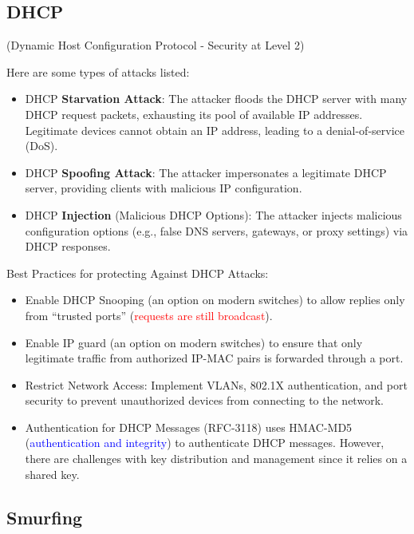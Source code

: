 \begin{center}
    \section{DHCP}
    (Dynamic Host Configuration Protocol - Security at Level 2)
\end{center}
Here are some types of attacks listed:
\begin{itemize}
    \item DHCP \textbf{Starvation Attack}: The attacker floods the DHCP server with many DHCP request packets, exhausting its pool of available IP addresses. Legitimate devices cannot obtain an IP address, leading to a denial-of-service (DoS).
    \item DHCP \textbf{Spoofing Attack}: The attacker impersonates a legitimate DHCP server, providing clients with malicious IP configuration.
    \item DHCP \textbf{Injection} (Malicious DHCP Options): The attacker injects malicious configuration options (e.g., false DNS servers, gateways, or proxy settings) via DHCP responses.
\end{itemize}

Best Practices for protecting Against DHCP Attacks:
\begin{itemize}
    \item Enable DHCP Snooping (an option on modern switches) to allow replies only from “trusted ports” (\textcolor{red}{requests are still broadcast}).
    \item Enable IP guard (an option on modern switches) to ensure that only legitimate traffic from authorized IP-MAC pairs is forwarded through a port.
    \item Restrict Network Access: Implement VLANs, 802.1X authentication, and port security to prevent unauthorized devices from connecting to the network.
    \item Authentication for DHCP Messages (RFC-3118) uses HMAC-MD5 (\textcolor{Blue}{authentication and integrity}) to authenticate DHCP messages. However, there are challenges with key distribution and management since it relies on a shared key.
\end{itemize}

\begin{center}
    \section{Smurfing}
\end{center}


